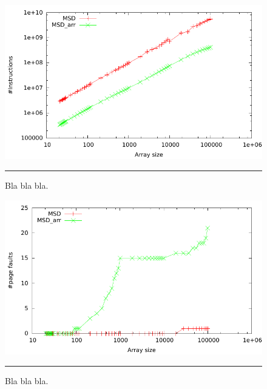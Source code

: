\begin{figure}[htbp]
	\centering
		\includegraphics[width=\textwidth]{./Figures/Project2b/Instructions.pdf}
		\rule{35em}{0.5pt}
	\caption[Instructions]{
	Bla bla bla.
	}
	\label{fig:Instructions}
\end{figure}

\begin{figure}[htbp]
	\centering
		\includegraphics[width=\textwidth]{./Figures/Project2b/Page_faults.pdf}
		\rule{35em}{0.5pt}
	\caption[Page faults]{
	Bla bla bla.
	}
	\label{fig:Page_faults}
\end{figure}


